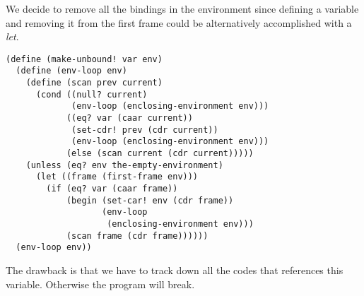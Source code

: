 \documentclass[a4paper,12pt]{article}
\begin{document}
We decide to remove all the bindings in the environment since defining
a variable and removing it from the first frame could be alternatively
accomplished with a \emph{let}.
\begin{lstlisting}
(define (make-unbound! var env)
  (define (env-loop env)
    (define (scan prev current)
      (cond ((null? current)
             (env-loop (enclosing-environment env)))
            ((eq? var (caar current))
             (set-cdr! prev (cdr current))
             (env-loop (enclosing-environment env)))
            (else (scan current (cdr current)))))
    (unless (eq? env the-empty-environment)
      (let ((frame (first-frame env)))
        (if (eq? var (caar frame))
            (begin (set-car! env (cdr frame))
                   (env-loop
                    (enclosing-environment env)))
            (scan frame (cdr frame))))))
  (env-loop env))
\end{lstlisting}

The drawback is that we have to track down all the codes that
references this variable.  Otherwise the program will break.
\end{document}
